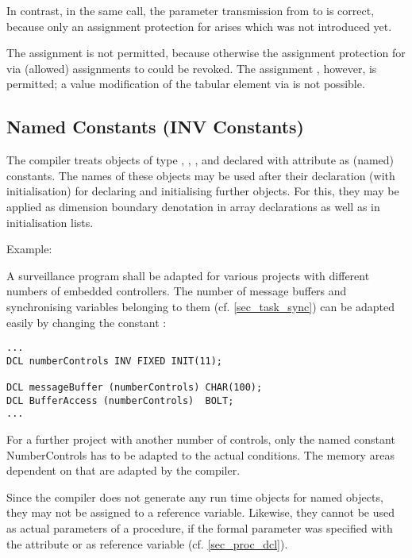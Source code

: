 In contrast, in the same call, the parameter transmission from 
 to 
is correct, because only an assignment protection for  arises which
was not introduced yet.

The assignment  is not permitted, because otherwise the assignment
protection for  via (allowed) assignments to 
 could be revoked.
The assignment , however, is permitted; a value modification
of the tabular element via  is not possible.

\subsection{Named Constants (INV Constants)}   %
\label{sec_named_const}

The compiler treats objects of type , ,
 ,  and
 declared with attribute 
 as (named) constants. The names of
these objects may be used after their declaration (with initialisation)
for declaring and initialising further objects. For this, they may be
applied as dimension boundary denotation in array declarations as well
as in initialisation lists.

\begin{minipage}{\linewidth}
Example:

A surveillance program shall be adapted for various projects with
different numbers of embedded controllers. The number of message
buffers and synchronising variables belonging to them 
(cf. \ref{sec_task_sync}) can be
adapted easily by changing the constant :

\begin{lstlisting}
...
DCL numberControls INV FIXED INIT(11);

DCL messageBuffer (numberControls) CHAR(100); 
DCL BufferAccess (numberControls)  BOLT;
...
\end{lstlisting}
\end{minipage}

For a further project with another number of controls, only the named
constant NumberControls has to be adapted to the actual conditions. The
memory areas dependent on that are adapted by the compiler.

Since the compiler does not generate any run time objects for named
objects, they may not be assigned to a reference variable. Likewise,
they cannot be used as actual parameters of a procedure, if the formal
parameter was specified with the   attribute or as reference
variable (cf. \ref{sec_proc_dcl}).

